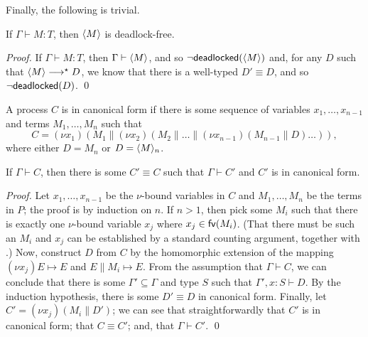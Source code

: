 \documentclass[orivec,envcountsame]{llncs}
\begin{document}
Finally, the following is trivial.

\begin{theorem}\label{thm:typed-terms-df}
  If $\Gamma \vdash M: T$, then $\langle M \rangle$ is deadlock-free.
\end{theorem}

\begin{proof}
  If $\Gamma \vdash M: T$, then $\Gamma \vdash \langle M \rangle$, and so
  $\lnot\mathsf{deadlocked}(\langle M \rangle)$ and, for any $D$ such that $\langle M \rangle \longrightarrow^\star D$, we
  know that there is a well-typed $D' \equiv D$, and so $\lnot\mathsf{deadlocked}(D)$. \qed
\end{proof}

\begin{definition}
A process $C$ is in canonical form if there is some sequence of variables $x_1,\dots,x_{n-1}$ and
terms $M_1,\dots,M_n$ such that
\[
  C = (\nu x_1)(M_1 \parallel (\nu x_2)(M_2 \parallel \dots \parallel (\nu x_{n-1})(M_{n-1} \parallel D)\dots)),
\]
where either $D = M_n$ or $D = \langle M \rangle_n$.
\end{definition}

\begin{lemma}\label{thm:canonical}
  If $\Gamma \vdash C$, then there is some $C' \equiv C$ such that $\Gamma \vdash C'$ and $C'$ is in
  canonical form.
\end{lemma}

\begin{proof}
  Let $x_1,\dots,x_{n-1}$ be the $\nu$-bound variables in $C$ and $M_1,\dots,M_n$ be the terms in
  $P$; the proof is by induction on $n$.  If $n > 1$, then pick some $M_i$ such that there is
  exactly one $\nu$-bound variable $x_j$ where $x_j \in \mathsf{fv}(M_i)$.  (That there must be such an
  $M_i$ and $x_j$ can be established by a standard counting argument, together with
  .)  Now, construct $D$ from $C$ by the homomorphic extension of
  the mapping $(\nu x_j)E \mapsto E$ and $E \parallel M_i \mapsto E$.  From the assumption that
  $\Gamma \vdash C$, we can conclude that there is some $\Gamma' \subseteq \Gamma$ and type $S$ such
  that $\Gamma',x:S \vdash D$.  By the induction hypothesis, there is some $D' \equiv D$ in
  canonical form.  Finally, let $C' = (\nu x_j)(M_i \parallel D')$; we can see that
  straightforwardly that $C'$ is in canonical form; that $C \equiv C'$; and, that $\Gamma \vdash
  C'$. \qed
\end{proof}
\end{document}

